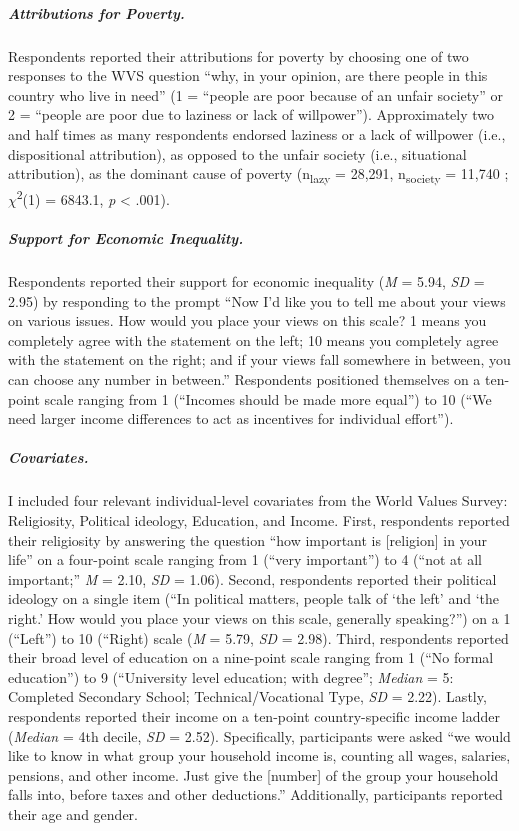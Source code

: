 \documentclass{sfuthesis}
\begin{document}
\subparagraph{Attributions for Poverty.} Respondents reported their attributions for poverty by choosing one of two responses to the WVS question “why, in your opinion, are there people in this country who live in need” (1 = “people are poor because of an unfair society” or 2 = “people are poor due to laziness or lack of willpower”). Approximately two and half times as many respondents endorsed laziness or a lack of willpower (i.e., dispositional attribution), as opposed to the unfair society (i.e., situational attribution), as the dominant cause of poverty (n\textsubscript{lazy} = 28,291, n\textsubscript{society} = 11,740 ; $\chi$\textsuperscript{2}(1) = 6843.1, \textit{p} < .001). 

\subparagraph{Support for Economic Inequality.} Respondents reported their support for economic inequality (\textit{M} = 5.94, \textit{SD} = 2.95) by responding to the prompt “Now I’d like you to tell me about your views on various issues. How would you place your views on this scale? 1 means you completely agree with the statement on the left; 10 means you completely agree with the statement on the right; and if your views fall somewhere in between, you can choose any number in between.” Respondents positioned themselves on a ten-point scale ranging from 1 (“Incomes should be made more equal”) to 10 (“We need larger income differences to act as incentives for individual effort”).

\subparagraph{Covariates.} I included four relevant individual-level covariates from the World Values Survey: Religiosity, Political ideology, Education, and Income. First, respondents reported their religiosity by answering the question “how important is [religion] in your life” on a four-point scale ranging from 1 (“very important”) to 4 (“not at all important;” \textit{M} = 2.10, \textit{SD} = 1.06). Second, respondents reported their political ideology on a single item (“In political matters, people talk of ‘the left’ and ‘the right.’ How would you place your views on this scale, generally speaking?”) on a 1 (“Left”) to 10 (“Right) scale (\textit{M} = 5.79, \textit{SD} = 2.98). Third, respondents reported their broad level of education on a nine-point scale ranging from 1 (“No formal education”) to 9 (“University level education; with degree”; \textit{Median} = 5: Completed Secondary School; Technical/Vocational Type, \textit{SD} = 2.22). Lastly, respondents reported their income on a ten-point country-specific income ladder (\textit{Median} = 4th decile, \textit{SD} = 2.52). Specifically, participants were asked “we would like to know in what group your household income is, counting all wages, salaries, pensions, and other income. Just give the [number] of the group your household falls into, before taxes and other deductions.” Additionally, participants reported their age and gender.
\end{document}
